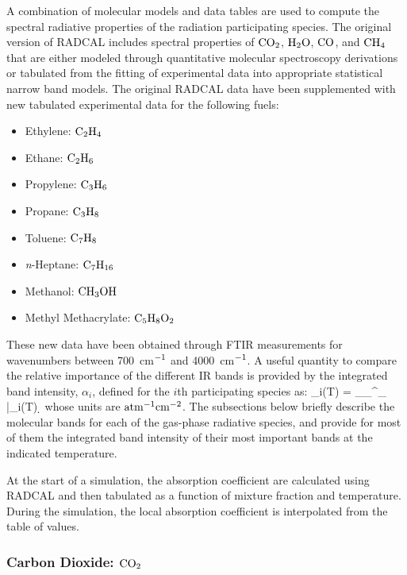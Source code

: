 A combination of molecular models and data tables are used to compute the spectral radiative
properties of the radiation participating species.
The original version of RADCAL includes spectral properties of $\rm CO_2$, $\rm H_2O$, $\rm CO$, and
$\rm CH_4$ that are either modeled through quantitative molecular spectroscopy derivations
or tabulated from the fitting of experimental data into appropriate statistical narrow band models.
The original RADCAL data have been supplemented with new tabulated experimental data
for the following fuels:
\begin{itemize}
  \item Ethylene:  $\rm C_2H_4$
  \item Ethane:    $\rm C_2H_6$
  \item Propylene: $\rm C_3H_6$
  \item Propane:   $\rm C_3H_8$
  \item Toluene:   $\rm C_7H_8$
  \item \textit{n}-Heptane: $\rm C_7H_{16}$
  \item Methanol:  $\rm CH_3OH$
  \item Methyl Methacrylate: $\rm C_5H_8O_2$
\end{itemize}
These new data have been obtained through FTIR measurements for wavenumbers between 700~cm$\rm ^{-1}$ and 4000~cm$\rm ^{-1}$.
A useful quantity to compare the relative importance of the different IR bands is provided by the integrated band intensity,
$\alpha_i$, defined for the $i$th participating species as:
\be
  \alpha_i(T) = \displaystyle\int_{\om_{\min}}^{\om_{\max}} \bar{\kappa}_i(T) \; \d \om
\ee
whose units are $\rm {atm^{-1} cm^{-2}}$. The subsections below briefly describe the molecular bands for each of the gas-phase radiative species, and provide for most of them the integrated band intensity of their most important bands at the indicated temperature.

At the start of a simulation, the absorption coefficient are calculated using RADCAL and then tabulated as a function of mixture fraction and temperature. During the simulation, the local absorption coefficient is interpolated from the table of values.

\subsubsection{Carbon Dioxide: $\rm CO_2$}

